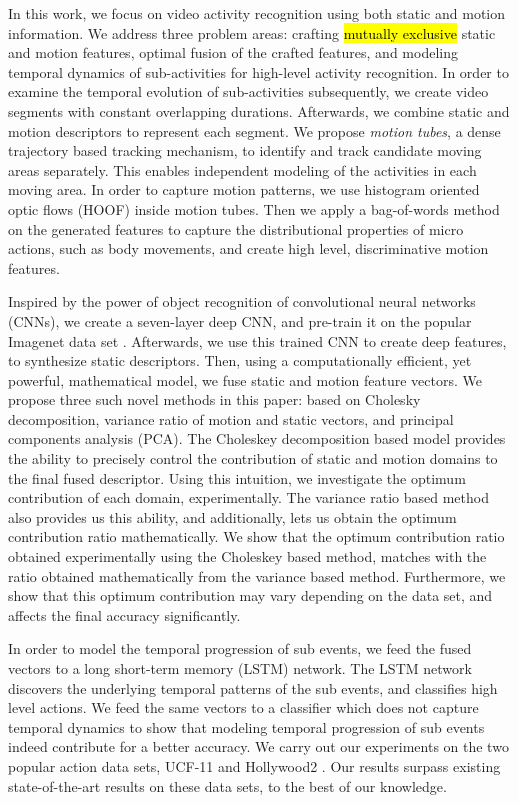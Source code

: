 In this work, we focus on video activity recognition using both static and motion information. We address three problem areas: crafting \hl{mutually exclusive} static and motion features, optimal fusion of the crafted features, and
modeling temporal dynamics of sub-activities for high-level activity recognition. In order to examine the temporal evolution
of sub-activities subsequently, we create video segments with constant overlapping durations. Afterwards, we combine static and motion
descriptors to represent each segment. We propose \textit{motion tubes},
a dense trajectory \cite{wang2011action} based tracking mechanism, to identify and track candidate moving areas
separately. This enables independent modeling of the activities in each moving area.
In order to capture motion patterns, we use histogram oriented optic flows (HOOF) \cite{chaudhry2009histograms}
inside motion tubes. Then we apply a bag-of-words method on the generated
features to capture the distributional properties of micro actions, such as body movements, and create high level, discriminative motion features.

Inspired by the power  of object recognition of convolutional neural networks (CNNs), we create a seven-layer deep
CNN, and pre-train it on the popular Imagenet data set \cite{deng2012imagenet}.
Afterwards, we use this trained CNN to create deep features, to synthesize static descriptors.
Then, using a computationally efficient, yet powerful, mathematical model, we fuse static and motion feature vectors. We propose three such novel methods in this paper: based on
Cholesky decomposition, variance ratio of motion and static vectors, and principal components analysis (PCA). The Choleskey decomposition based model provides the ability to
precisely control the contribution of static and motion domains to the final fused descriptor. Using this intuition, we investigate the
optimum contribution of each domain, experimentally.  The variance ratio based method also provides us this ability, and additionally, lets us
obtain the optimum contribution ratio mathematically. We show that the optimum contribution ratio obtained experimentally using the Choleskey based method,
matches with the ratio obtained mathematically from the variance based method. Furthermore, we show that this optimum contribution may
vary depending on the data set, and affects the final accuracy significantly.


In order to model the temporal progression of sub events, we feed the fused vectors to
a long short-term memory (LSTM) network. The LSTM network discovers the underlying temporal patterns of the sub events, and classifies high level actions.
We feed the same vectors to a classifier which does not capture temporal dynamics to show that modeling temporal progression of sub events indeed contribute for a better
accuracy. We carry out our experiments on the two popular action data sets, UCF-11 \cite{liu2009recognizing}
and Hollywood2 \cite{marszalek2009actions}. Our results surpass existing  state-of-the-art
results on these data sets, to the best of our knowledge.

